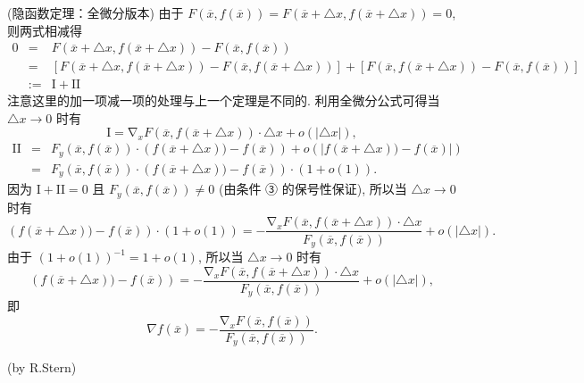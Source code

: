 \begin{theorem}{(隐函数定理：全微分版本)}
由于 $F(\overline{x},f(\overline{x}))=F(\overline{x}+\triangle x,f(\overline{x}+\triangle x))=0$,
则两式相减得
$$
\begin{eqnarray*}
0 & = & F(\overline{x}+\triangle x,f(\overline{x}+\triangle x))-F(\overline{x},f(\overline{x}))\\
 & = & \left[F(\overline{x}+\triangle x,f(\overline{x}+\triangle x))-F(\overline{x},f(\overline{x}+\triangle x))\right]+\left[F(\overline{x},f(\overline{x}+\triangle x))-F(\overline{x},f(\overline{x}))\right]\\
 & := & \mathrm{I}+\mathrm{II}
\end{eqnarray*}
$$
注意这里的加一项减一项的处理与上一个定理是不同的. 利用全微分公式可得当 $\triangle x\rightarrow0$ 时有
\[
\mathrm{I}=\mathrm{\nabla}_{x}F(\overline{x},f(\overline{x}+\triangle x))\cdot\triangle x+o(|\triangle x|),
\]
$$
\begin{eqnarray*}
\mathrm{II} & = & F_{y}(\overline{x},f(\overline{x}))\cdot\left(f(\overline{x}+\triangle x))-f(\overline{x})\right)+o\left(|f(\overline{x}+\triangle x))-f(\overline{x})|\right)\\
 & = & F_{y}(\overline{x},f(\overline{x}))\cdot\left(f(\overline{x}+\triangle x))-f(\overline{x})\right)\cdot(1+o(1)).
\end{eqnarray*}
$$
因为 $\mathrm{I}+\mathrm{II}=0$ 且 $F_{y}(\overline{x},f(\overline{x}))\neq0$
(由条件 ③ 的保号性保证), 所以当 $\triangle x\rightarrow0$ 时有
\[
\left(f(\overline{x}+\triangle x))-f(\overline{x})\right)\cdot(1+o(1))={\displaystyle -\frac{\mathrm{\nabla}_{x}F(\overline{x},f(\overline{x}+\triangle x))\cdot\triangle x}{F_{y}(\overline{x},f(\overline{x}))}+o(|\triangle x|).}
\]
由于 $(1+o(1))^{-1}=1+o(1)$, 所以当 $\triangle x\rightarrow0$ 时有
\[
\left(f(\overline{x}+\triangle x))-f(\overline{x})\right)={\displaystyle -\frac{\mathrm{\nabla}_{x}F(\overline{x},f(\overline{x}+\triangle x))\cdot\triangle x}{F_{y}(\overline{x},f(\overline{x}))}+o(|\triangle x|),}
\]
即 
\[
\nabla f(\overline{x})=-\frac{\mathrm{\nabla}_{x}F(\overline{x},f(\overline{x}))}{F_{y}(\overline{x},f(\overline{x}))}.
\]



 \end{theorem}
(by R.Stern)
